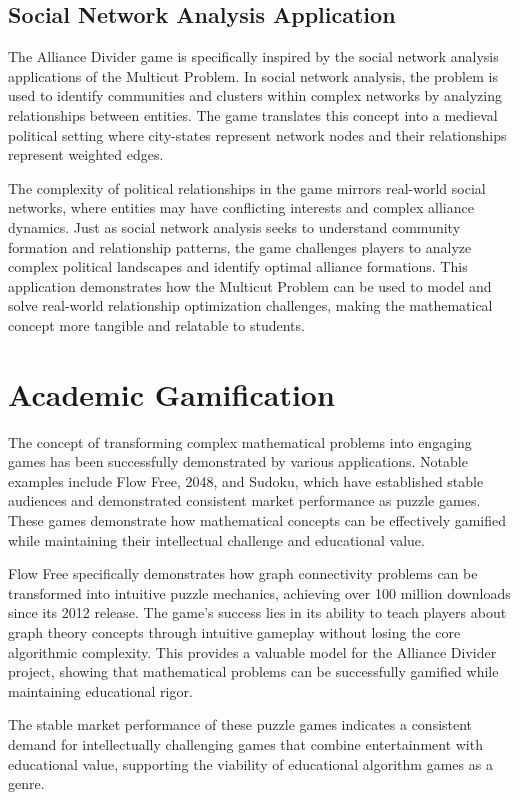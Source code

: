 \documentclass[english]{tudscrreprt}
\begin{document}
\subsection{Social Network Analysis Application}
The Alliance Divider game is specifically inspired by the social network analysis applications of the Multicut Problem. In social network analysis, the problem is used to identify communities and clusters within complex networks by analyzing relationships between entities. The game translates this concept into a medieval political setting where city-states represent network nodes and their relationships represent weighted edges.

The complexity of political relationships in the game mirrors real-world social networks, where entities may have conflicting interests and complex alliance dynamics. Just as social network analysis seeks to understand community formation and relationship patterns, the game challenges players to analyze complex political landscapes and identify optimal alliance formations. This application demonstrates how the Multicut Problem can be used to model and solve real-world relationship optimization challenges, making the mathematical concept more tangible and relatable to students.

\section{Academic Gamification}
The concept of transforming complex mathematical problems into engaging games has been successfully demonstrated by various applications. Notable examples include Flow Free, 2048, and Sudoku, which have established stable audiences and demonstrated consistent market performance as puzzle games. These games demonstrate how mathematical concepts can be effectively gamified while maintaining their intellectual challenge and educational value.

Flow Free specifically demonstrates how graph connectivity problems can be transformed into intuitive puzzle mechanics, achieving over 100 million downloads since its 2012 release. The game's success lies in its ability to teach players about graph theory concepts through intuitive gameplay without losing the core algorithmic complexity. This provides a valuable model for the Alliance Divider project, showing that mathematical problems can be successfully gamified while maintaining educational rigor.

The stable market performance of these puzzle games indicates a consistent demand for intellectually challenging games that combine entertainment with educational value, supporting the viability of educational algorithm games as a genre.
\end{document}
